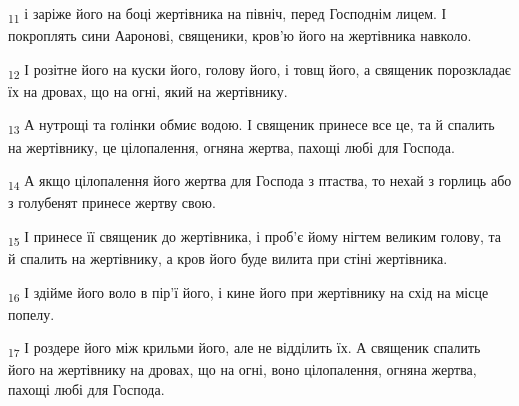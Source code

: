\begin{tcolorbox}
\textsubscript{11} і заріже його на боці жертівника на північ, перед Господнім лицем. І покроплять сини Ааронові, священики, кров'ю його на жертівника навколо.
\end{tcolorbox}
\begin{tcolorbox}
\textsubscript{12} І розітне його на куски його, голову його, і товщ його, а священик порозкладає їх на дровах, що на огні, який на жертівнику.
\end{tcolorbox}
\begin{tcolorbox}
\textsubscript{13} А нутрощі та голінки обмиє водою. І священик принесе все це, та й спалить на жертівнику, це цілопалення, огняна жертва, пахощі любі для Господа.
\end{tcolorbox}
\begin{tcolorbox}
\textsubscript{14} А якщо цілопалення його жертва для Господа з птаства, то нехай з горлиць або з голубенят принесе жертву свою.
\end{tcolorbox}
\begin{tcolorbox}
\textsubscript{15} І принесе її священик до жертівника, і проб'є йому нігтем великим голову, та й спалить на жертівнику, а кров його буде вилита при стіні жертівника.
\end{tcolorbox}
\begin{tcolorbox}
\textsubscript{16} І здійме його воло в пір'ї його, і кине його при жертівнику на схід на місце попелу.
\end{tcolorbox}
\begin{tcolorbox}
\textsubscript{17} І роздере його між крильми його, але не відділить їх. А священик спалить його на жертівнику на дровах, що на огні, воно цілопалення, огняна жертва, пахощі любі для Господа.
\end{tcolorbox}
